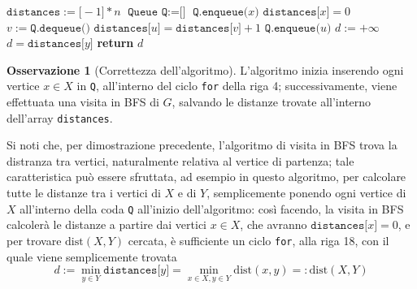 \documentclass[14pt]{extreport}
\theoremstyle{definition}
\theoremstyle{definition}
\newtheorem{remark}{Osservazione}[subsection]
\begin{document}
\begin{algorithm}[H]
    \caption{
        Dato un grafo $G$, rappresentato attraverso liste di adiacenza, e due suoi sottoinsiemi di vertici $X, Y \subseteq V(G)$, l'algoritmo restituisce $\mathrm{dist}(X, Y)$.\\
        \textbf{Input}: $G$ grafo, rappresentato attraverso liste di adiacenza; $X, Y \subseteq V(G)$ sottoinsiemi di vertici di $G$.\\
        \textbf{Output}: $\mathrm{dist}(X, Y)$.
    }

    \begin{algorithmic}[1]
            \State $\texttt{distances}:=\texttt{[}-1\texttt{]} * n$
            \State $\texttt{Queue Q} := \texttt{[}\texttt{]}$
                \State $\texttt{Q.enqueue(}x\texttt{)}$
                \State $\texttt{distances[}x\texttt{]} = 0$ 
            \EndFor
                \State $v := \texttt{Q.dequeue()}$
                     
                        \State $\texttt{distances[}u\texttt{]}=\texttt{distances[}v\texttt{]} + 1$
                        \State $\texttt{Q.enqueue(}u\texttt{)}$
                    \EndIf
                \EndFor
            \EndWhile
            \State $d := + \infty$
                    \State $d = \texttt{distances[}y\texttt{]}$
                \EndIf
            \EndFor
            \State \textbf{return} $d$
        \EndFunction
    \end{algorithmic}
\end{algorithm}

\begin{remark}[Correttezza dell'algoritmo]
    L'algoritmo inizia inserendo ogni vertice $x \in X$ in \texttt{Q}, all'interno del ciclo \texttt{for} della riga 4; successivamente, viene effettuata una visita in BFS di $G$, salvando le distanze trovate all'interno dell'array \texttt{distances}.

    Si noti che, per dimostrazione precedente, l'algoritmo di visita in BFS trova la distranza tra vertici, naturalmente relativa al vertice di partenza; tale caratteristica può essere sfruttata, ad esempio in questo algoritmo, per calcolare tutte le distanze tra i vertici di $X$ e di $Y$, semplicemente ponendo ogni vertice di $X$ all'interno della coda \texttt{Q} all'inizio dell'algoritmo: così facendo, la visita in BFS calcolerà le distanze a partire dai vertici $x \in X$, che avranno $\texttt{distances[}x\texttt{]} = 0$, e per trovare $\mathrm{dist}(X, Y)$ cercata, è sufficiente un ciclo \texttt{for}, alla riga 18, con il quale viene semplicemente trovata $$\displaystyle d := \min_{y \in Y}{\texttt{distances[}y\texttt{]}} = \min_{x \in X, y \in Y}{\mathrm{dist}(x, y)} =: \mathrm{dist}(X, Y)$$
\end{remark}
\end{document}
